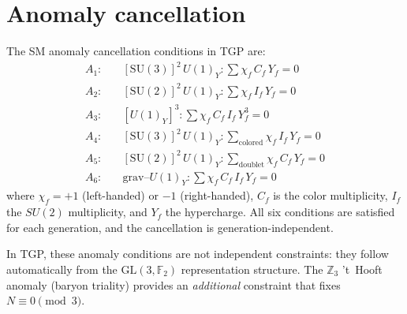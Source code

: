 \documentclass[aps,prd,twocolumn,superscriptaddress,showpacs,
  nofootinbib,floatfix,longbibliography]{revtex4-2}
\newcommand{\GL}{\mathrm{GL}(3,\mathbb{F}_2)}
\newcommand{\ZZ}{\mathbb{Z}}
\begin{document}
\section{Anomaly cancellation}\label{app:anomalies}

The SM anomaly cancellation conditions in TGP are:
\begin{align}
  A_1: & \quad [\mathrm{SU}(3)]^2\,U(1)_Y: \sum \chi_f\,C_f\,Y_f = 0 \\
  A_2: & \quad [\mathrm{SU}(2)]^2\,U(1)_Y: \sum \chi_f\,I_f\,Y_f = 0 \\
  A_3: & \quad [U(1)_Y]^3: \sum \chi_f\,C_f\,I_f\,Y_f^3 = 0 \\
  A_4: & \quad [\mathrm{SU}(3)]^2\,U(1)_Y: \sum_\mathrm{colored} \chi_f\,I_f\,Y_f = 0 \\
  A_5: & \quad [\mathrm{SU}(2)]^2\,U(1)_Y: \sum_\mathrm{doublet} \chi_f\,C_f\,Y_f = 0 \\
  A_6: & \quad \mathrm{grav}\text{--}U(1)_Y: \sum \chi_f\,C_f\,I_f\,Y_f = 0
\end{align}
where $\chi_f = +1$ (left-handed) or $-1$ (right-handed), $C_f$ is the
color multiplicity, $I_f$ the $SU(2)$ multiplicity, and $Y_f$ the
hypercharge. All six conditions are satisfied for each generation,
and the cancellation is generation-independent.

In TGP, these anomaly conditions are not independent constraints:
they follow automatically from the $\GL$ representation structure.
The $\ZZ_3$ 't~Hooft anomaly (baryon triality) provides an
\emph{additional} constraint that fixes $N \equiv 0 \pmod{3}$.
\end{document}
